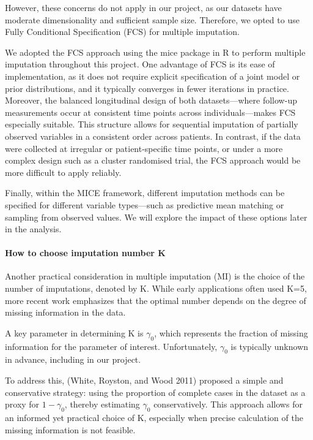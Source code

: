 \documentclass{article}
\begin{document}
However, these concerns do not apply in our project, as our datasets
have moderate dimensionality and sufficient sample size. Therefore, we
opted to use Fully Conditional Specification (FCS) for multiple
imputation.

We adopted the FCS approach using the mice package in R to perform
multiple imputation throughout this project. One advantage of FCS is its
ease of implementation, as it does not require explicit specification of
a joint model or prior distributions, and it typically converges in
fewer iterations in practice. Moreover, the balanced longitudinal design
of both datasets---where follow-up measurements occur at consistent time
points across individuals---makes FCS especially suitable. This
structure allows for sequential imputation of partially observed
variables in a consistent order across patients. In contrast, if the
data were collected at irregular or patient-specific time points, or
under a more complex design such as a cluster randomised trial, the FCS
approach would be more difficult to apply reliably.

Finally, within the MICE framework, different imputation methods can be
specified for different variable types---such as predictive mean
matching or sampling from observed values. We will explore the impact of
these options later in the analysis.

\paragraph{How to choose imputation number
K}\label{how-to-choose-imputation-number-k}

Another practical consideration in multiple imputation (MI) is the
choice of the number of imputations, denoted by K. While early
applications often used K=5, more recent work emphasizes that the
optimal number depends on the degree of missing information in the data.

A key parameter in determining K is \(\gamma_{0}\), which represents the
fraction of missing information for the parameter of interest.
Unfortunately, \(\gamma_{0}\) is typically unknown in advance, including
in our project.

To address this, (White, Royston, and Wood 2011) proposed a simple and
conservative strategy: using the proportion of complete cases in the
dataset as a proxy for \(1-\gamma_{0}\), thereby estimating
\(\gamma_{0}\) conservatively. This approach allows for an informed yet
practical choice of K, especially when precise calculation of the
missing information is not feasible.
\end{document}
